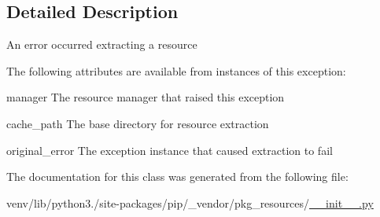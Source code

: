 \subsection{Detailed Description}
\begin{DoxyVerb}An error occurred extracting a resource

The following attributes are available from instances of this exception:

manager
    The resource manager that raised this exception

cache_path
    The base directory for resource extraction

original_error
    The exception instance that caused extraction to fail
\end{DoxyVerb}
 

The documentation for this class was generated from the following file\+:\begin{DoxyCompactItemize}
\item 
venv/lib/python3./site-\/packages/pip/\+\_\+vendor/pkg\+\_\+resources/\hyperlink{venv_2lib_2python3_89_2site-packages_2pip_2__vendor_2pkg__resources_2____init_____8py}{\+\_\+\+\_\+init\+\_\+\+\_\+.\+py}\end{DoxyCompactItemize}
